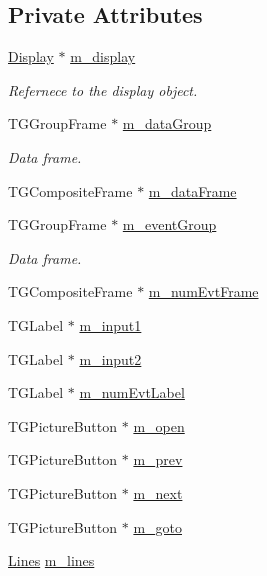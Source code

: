 \subsection*{Private Attributes}
\begin{DoxyCompactItemize}
\item 
\hyperlink{class_d_d4hep_1_1_display}{Display} $\ast$ \hyperlink{class_d_d4hep_1_1_event_control_ad9786c7cb28b2c715ba6343a2c62362a}{m\+\_\+display}
\begin{DoxyCompactList}\small\item\em Refernece to the display object. \end{DoxyCompactList}\item 
T\+G\+Group\+Frame $\ast$ \hyperlink{class_d_d4hep_1_1_event_control_af0528badfa37dba89e2d73c83f246e08}{m\+\_\+data\+Group}
\begin{DoxyCompactList}\small\item\em Data frame. \end{DoxyCompactList}\item 
T\+G\+Composite\+Frame $\ast$ \hyperlink{class_d_d4hep_1_1_event_control_aee2bb0377218bcfbad0fc757ffd926cb}{m\+\_\+data\+Frame}
\item 
T\+G\+Group\+Frame $\ast$ \hyperlink{class_d_d4hep_1_1_event_control_a26358da45905074e309f36f245558a92}{m\+\_\+event\+Group}
\begin{DoxyCompactList}\small\item\em Data frame. \end{DoxyCompactList}\item 
T\+G\+Composite\+Frame $\ast$ \hyperlink{class_d_d4hep_1_1_event_control_a0c4a8e3502931ab1b993054ef87942c7}{m\+\_\+num\+Evt\+Frame}
\item 
T\+G\+Label $\ast$ \hyperlink{class_d_d4hep_1_1_event_control_ac057e1afd1f6e5f3490a6e2b35dc6caa}{m\+\_\+input1}
\item 
T\+G\+Label $\ast$ \hyperlink{class_d_d4hep_1_1_event_control_a1d9b69907b96154bc0cca2b7619b903b}{m\+\_\+input2}
\item 
T\+G\+Label $\ast$ \hyperlink{class_d_d4hep_1_1_event_control_aa88e023fadd68daabea42dad9aa4cbe6}{m\+\_\+num\+Evt\+Label}
\item 
T\+G\+Picture\+Button $\ast$ \hyperlink{class_d_d4hep_1_1_event_control_ae2a938df9e309454c1170c23c69a4214}{m\+\_\+open}
\item 
T\+G\+Picture\+Button $\ast$ \hyperlink{class_d_d4hep_1_1_event_control_a5dc965be42f51a9499cb4fecbd269ed5}{m\+\_\+prev}
\item 
T\+G\+Picture\+Button $\ast$ \hyperlink{class_d_d4hep_1_1_event_control_a238b8108eaa10db3e1b50872795cd9a6}{m\+\_\+next}
\item 
T\+G\+Picture\+Button $\ast$ \hyperlink{class_d_d4hep_1_1_event_control_ac6976dc6f6e1356fa5e6243338f41d05}{m\+\_\+goto}
\item 
\hyperlink{class_d_d4hep_1_1_event_control_a662fec8b3e1e89af1cf704e41cb7df78}{Lines} \hyperlink{class_d_d4hep_1_1_event_control_a773981f8dbddb1f17a2f7801a62206bd}{m\+\_\+lines}
\end{DoxyCompactItemize}
